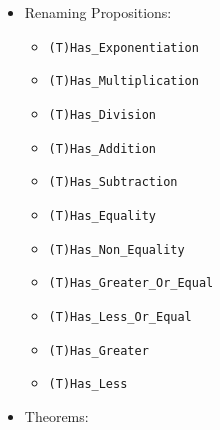 \documentclass{article}
\begin{document}
\begin{itemize}
\item Renaming Propositions:

  \begin{itemize}
  \item \texttt{(T)Has_Exponentiation}
  \item \texttt{(T)Has_Multiplication}
  \item \texttt{(T)Has_Division}
  \item \texttt{(T)Has_Addition}
  \item \texttt{(T)Has_Subtraction}
  \item \texttt{(T)Has_Equality}
  \item \texttt{(T)Has_Non_Equality}
  \item \texttt{(T)Has_Greater_Or_Equal}
  \item \texttt{(T)Has_Less_Or_Equal}
  \item \texttt{(T)Has_Greater}
  \item \texttt{(T)Has_Less}
  \end{itemize}

\item Theorems:


\end{itemize}
\end{document}
